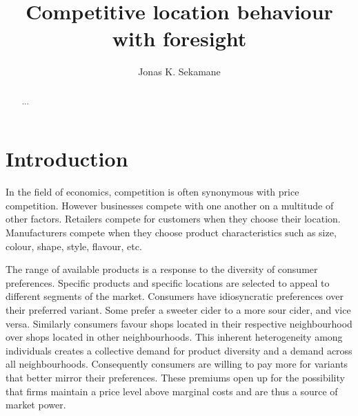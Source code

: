 \documentclass[preprint, 12pt]{elsarticle}
\begin{document}

\begin{frontmatter}

\title{Competitive location behaviour with foresight}
\author{Jonas K. Sekamane}

\begin{abstract}
{...}
\end{abstract}

\end{frontmatter}

\singlespacing
\makeatletter
\makeatother
\onehalfspacing

\newpage
\clearpage
{}

\section{Introduction}

In the field of economics, competition is often synonymous with price competition. However businesses compete with one another on a multitude of other factors. Retailers compete for customers when they choose their location. Manufacturers compete when they choose product characteristics such as size, colour, shape, style, flavour, etc. 

The range of available products is a response to the diversity of consumer preferences. Specific products and specific locations are selected to appeal to different segments of the market. Consumers have idiosyncratic preferences over their preferred variant. Some prefer a sweeter cider to a more sour cider, and vice versa. Similarly consumers favour shops located in their respective neighbourhood over shops located in other neighbourhoods. This inherent heterogeneity among individuals creates a collective demand for product diversity and a demand across all neighbourhoods. Consequently consumers are willing to pay more for variants that better mirror their preferences. These premiums open up for the possibility that firms maintain a price level above marginal costs and are thus a source of market power.
\end{document}
